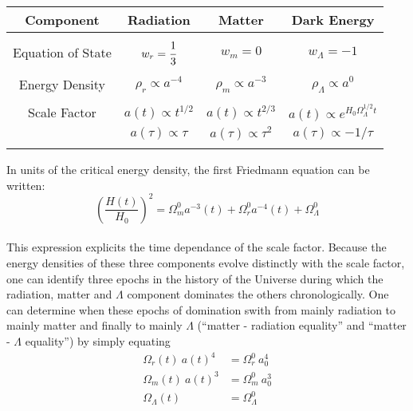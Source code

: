 \begin{table}[!htbp]
	\begin{center}
		\begin{tabular}{cccc}
			\textbf{Component} & \textbf{Radiation} & \textbf{Matter} & \textbf{Dark Energy}\\[2pt]
			\hline \\[-10pt]
			Equation of State & $w_r = \cfrac{1}{3}$ & $w_m = 0$ & $w_\Lambda = -1$ \\[2pt]
			\hline \\[-10pt]
			Energy Density & $\rho_r \propto a^{-4}$ & $\rho_m \propto a^{-3}$ & $\rho_\Lambda \propto a^{0}$ \\[2pt]
			\hline \\[-10pt]
			Scale Factor & $a(t) \propto t^{1/2}$ & $a(t) \propto t^{2/3}$ & $a(t) \propto e^{H_0 \Omega_\Lambda^{1/2} t}$ \\[2pt]
			 & $a(\tau) \propto \tau$ & $a(\tau) \propto \tau^{2}$ & $a(\tau) \propto - 1/\tau$ \\[2pt]
			\hline \\[-10pt]
		\end{tabular}
	\end{center}
\end{table}

In units of the critical energy density, the first Friedmann equation can be written: \\

\begin{equation}
\left( \frac{H(t)}{H_0} \right)^2 = \Omega^0_m a^{-3}(t) + \Omega^0_r a^{-4}(t) + \Omega^0_\Lambda
\end{equation} \\ This expression explicits the time dependance of the scale factor. Because the energy densities of these three components evolve distinctly with the scale factor, one can identify three epochs in the history of the Universe during which the radiation, matter and $\Lambda$ component dominates the others chronologically. One can determine when these epochs of domination swith from mainly radiation to mainly matter and finally to mainly $\Lambda$ (``matter - radiation equality'' and ``matter - $\Lambda$ equality'') by simply equating\\

\begin{align*}
\Omega_r (t) ~ a(t)^4 &= \Omega_r^0 ~ a_0^4\\
\Omega_m (t) ~ a(t)^3 &= \Omega_m^0 ~ a_0^3\\
\Omega_\Lambda (t) &= \Omega_\Lambda^0
\end{align*}\\

